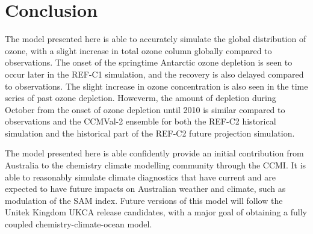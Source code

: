 \section{Conclusion}

The model presented here is able to accurately simulate the global distribution of ozone, with a slight increase in total ozone column globally compared to observations. The onset of the springtime Antarctic ozone depletion is seen to occur later in the REF-C1 simulation, and the recovery is also delayed compared to observations. The slight increase in ozone concentration is also seen in the time series of past ozone depletion. Howeverm, the amount of depletion during October from the onset of ozone depletion until 2010 is similar compared to observations and the CCMVal-2 ensemble for both the REF-C2 historical simulation and the historical part of the REF-C2 future projection simulation.

The model presented here is able confidently provide an initial contribution from Australia to the chemistry climate modelling community through the CCMI. It is able to reasonably simulate climate diagnostics that have current and are expected to have future impacts on Australian weather and climate, such as modulation of the SAM index. Future versions of this model will follow the Unitek Kingdom UKCA release candidates, with a major goal of obtaining a fully coupled chemistry-climate-ocean model.